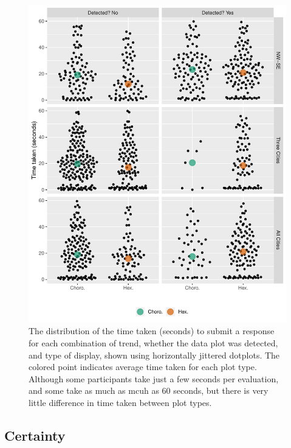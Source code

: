 \documentclass[conference,final,]{IEEEtran}
\begin{document}
\begin{figure}
\includegraphics[width=1\linewidth]{paper_files/figure-latex/beeswarm-1} \caption{The distribution of the time taken (seconds) to submit a response for each combination of trend, whether the data plot was detected, and type of display, shown using horizontally jittered dotplots. The colored point indicates average time taken for each plot type. Although some participants take just a few seconds per evaluation, and some take as much as mcuh as 60 seconds, but there is very little difference in time taken between plot types.}\label{fig:beeswarm}
\end{figure}

\hypertarget{certainty}{%
\subsection{Certainty}\label{certainty}}
\end{document}
